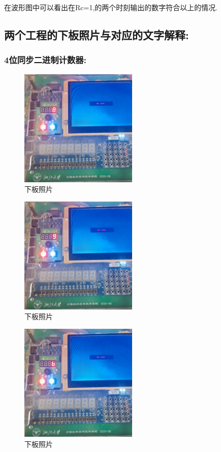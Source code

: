 \documentclass{article}
\begin{document}
在波形图中可以看出在Rc=1,的两个时刻输出的数字符合以上的情况.

\subsection*{两个工程的下板照片与对应的文字解释:}

\subsubsection*{4位同步二进制计数器:}
    \begin{figure}[H]
    \centering
    \includegraphics[width=0.5\textwidth]{lab10p/3.jpg}
    \caption{\label{Lab10}下板照片}
    \end{figure}

    \begin{figure}[H]
    \centering
    \includegraphics[width=0.5\textwidth]{lab10p/4.jpg}
    \caption{\label{Lab10}下板照片}
    \end{figure}

    \begin{figure}[H]
    \centering
    \includegraphics[width=0.5\textwidth]{lab10p/5.jpg}
    \caption{\label{Lab10}下板照片}
    \end{figure}
\end{document}
